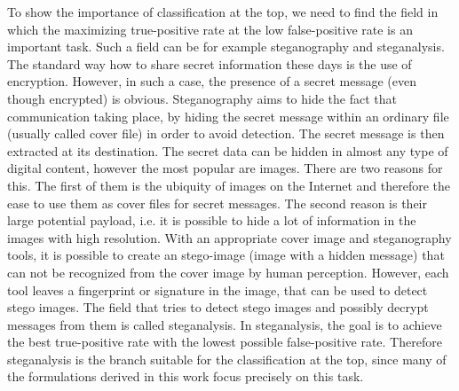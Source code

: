 To show the importance of classification at the top, we need to find the field in which the maximizing true-positive rate at the low false-positive rate is an important task. Such a field can be for example steganography and steganalysis. The standard way how to share secret information these days is the use of encryption. However, in such a case, the presence of a secret message (even though encrypted) is obvious. Steganography aims to hide the fact that communication taking place, by hiding the secret message within an ordinary file (usually called cover file) in order to avoid detection. The secret message is then extracted at its destination. The secret data can be hidden in almost any type of digital content, however the most popular are images. There are two reasons for this. The first of them is the ubiquity of images on the Internet and therefore the ease to use them as cover files for secret messages. The second reason is their large potential payload, i.e. it is possible to hide a lot of information in the images with high resolution. With an appropriate cover image and steganography tools, it is possible to create an stego-image (image with a hidden message) that can not be recognized from the cover image by human perception. However, each tool leaves a fingerprint or signature in the image, that can be used to detect stego images. The field that tries to detect stego images and possibly decrypt messages from them is called steganalysis. In steganalysis, the goal is to achieve the best true-positive rate with the lowest possible false-positive rate. Therefore steganalysis is the branch suitable for the classification at the top, since many of the formulations derived in this work focus precisely on this task. \cite{morkel2005overview, silman2001steganography} 

